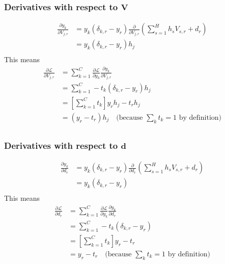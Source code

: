 \documentclass{article}
\begin{document}
\subsubsection*{Derivatives with respect to $\mathbf{V}$}
\begin{equation}
\begin{split}
    \frac{\partial y_k}{\partial V_{j,r}}
    &= y_k (\delta_{k,r} - y_r) \frac{\partial}{\partial V_{j,r}}
       \left(\sum_{s=1}^H h_s V_{s,r} + d_r \right)\\
    &= y_k (\delta_{k,r} - y_r) h_j \\
\end{split}
\end{equation}
This means
\begin{equation}
\begin{split}
    \frac{\partial \mathcal{L}}{\partial V_{j,r}}
    &= \sum_{k=1}^C \frac{\partial \mathcal{L}}{\partial y_k}
                    \frac{\partial y_k}{\partial V_{j,r}} \\
    &= \sum_{k=1}^C -t_k (\delta_{k,r} - y_r) h_j \\
    &= \left[\sum_{k=1}^C t_k \right]y_r h_j - t_r h_j\\
    &= (y_r - t_r)h_j \quad \textrm{(because $\sum_k t_k
       = 1$ by definition)} \\
\end{split}
\end{equation}

\subsubsection*{Derivatives with respect to $\mathbf{d}$}
\begin{equation}
\begin{split}
    \frac{\partial y_k}{\partial d_r}
    &= y_k (\delta_{k,r} - y_r) \frac{\partial}{\partial d_r}
       \left(\sum_{s=1}^H h_s V_{s,r} + d_r \right)\\
    &= y_k (\delta_{k,r} - y_r) \\
\end{split}
\end{equation}
This means
\begin{equation}
\begin{split}
    \frac{\partial \mathcal{L}}{\partial d_r}
    &= \sum_{k=1}^C \frac{\partial \mathcal{L}}{\partial y_k}
                    \frac{\partial y_k}{\partial d_r} \\
    &= \sum_{k=1}^C -t_k (\delta_{k,r} - y_r)\\
    &= \left[\sum_{k=1}^C t_k \right]y_r - t_r \\
    &= y_r - t_r \quad \textrm{(because $\sum_k t_k = 1$ by definition)} \\
\end{split}
\end{equation}
\end{document}
